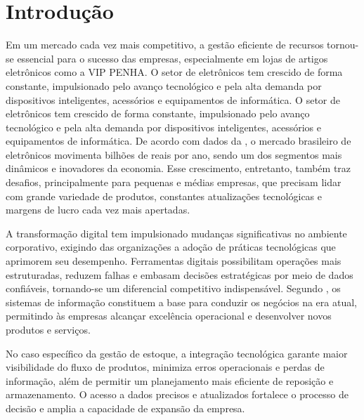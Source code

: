 \documentclass[
	12pt,				%
	openany,			%
	twoside,			%
	a4paper,			%
	english,			%
	brazil				%
	]{abntex2}
\begin{document}
\textual

\chapter{Introdução}
Em um mercado cada vez mais competitivo, a gestão eficiente de recursos tornou-se essencial para o sucesso das empresas, especialmente em lojas de artigos eletrônicos como a VIP PENHA. O setor de eletrônicos tem crescido de forma constante, impulsionado pelo avanço tecnológico e pela alta demanda por dispositivos inteligentes, acessórios e equipamentos de informática. O setor de eletrônicos tem crescido de forma constante, impulsionado pelo avanço tecnológico e pela alta demanda por dispositivos inteligentes, acessórios e equipamentos de informática. De acordo com dados da , o mercado brasileiro de eletrônicos movimenta bilhões de reais por ano, sendo um dos segmentos mais dinâmicos e inovadores da economia. Esse crescimento, entretanto, também traz desafios, principalmente para pequenas e médias empresas, que precisam lidar com grande variedade de produtos, constantes atualizações tecnológicas e margens de lucro cada vez mais apertadas.

A transformação digital tem impulsionado mudanças significativas no ambiente corporativo, exigindo das organizações a adoção de práticas tecnológicas que aprimorem seu desempenho. Ferramentas digitais possibilitam operações mais estruturadas, reduzem falhas e embasam decisões estratégicas por meio de dados confiáveis, tornando-se um diferencial competitivo indispensável. Segundo , os sistemas de informação constituem a base para conduzir os negócios na era atual, permitindo às empresas alcançar excelência operacional e desenvolver novos produtos e serviços.

No caso específico da gestão de estoque, a integração tecnológica garante maior visibilidade do fluxo de produtos, minimiza erros operacionais e perdas de informação, além de permitir um planejamento mais eficiente de reposição e armazenamento. O acesso a dados precisos e atualizados fortalece o processo de decisão e amplia a capacidade de expansão da empresa.
\end{document}
